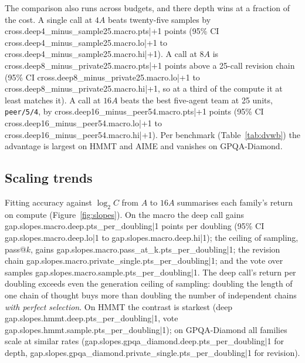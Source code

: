 \documentclass[11pt]{article}
\begin{document}
{{{{\begin{table}[htbp]
\centering
\small

\caption{Macro paired differences in accuracy points at equal realized compute $C = mA$.}
\label{tab:dvw}
\end{table}

The comparison also runs across budgets, and there depth wins at a fraction of the cost. A single call at
$4A$ beats twenty-five samples by {{cross.deep4_minus_sample25.macro.pts|+1}} points (95\% CI
{{cross.deep4_minus_sample25.macro.lo|+1}} to {{cross.deep4_minus_sample25.macro.hi|+1}}). A call at $8A$ is
{{cross.deep8_minus_private25.macro.pts|+1}} points above a 25-call revision chain (95\% CI
{{cross.deep8_minus_private25.macro.lo|+1}} to {{cross.deep8_minus_private25.macro.hi|+1}}, so at a third
of the compute it at least matches it). A call at $16A$
beats the best five-agent team at 25 units, \texttt{peer/5/4}, by {{cross.deep16_minus_peer54.macro.pts|+1}}
points (95\% CI {{cross.deep16_minus_peer54.macro.lo|+1}} to {{cross.deep16_minus_peer54.macro.hi|+1}}).
Per benchmark (Table~\ref{tab:dvwb}) the advantage is largest on HMMT and AIME and vanishes on GPQA-Diamond.

\begin{table}[htbp]
\centering
\small

\caption{Per-benchmark paired differences in points at equal realized compute. With 24 items per benchmark
one item is 4.2 points; intervals are in \texttt{numbers.json}.}
\label{tab:dvwb}
\end{table}

\subsection{Scaling trends}
\label{sec:slopes}

Fitting accuracy against $\log_2 C$ from $A$ to $16A$ summarises each family's return on compute
(Figure~\ref{fig:slopes}). On the macro the deep call gains {{gap.slopes.macro.deep.pts_per_doubling|1}}
points per doubling (95\% CI {{gap.slopes.macro.deep.lo|1}} to {{gap.slopes.macro.deep.hi|1}}); the ceiling of
sampling, pass@$k$, gains {{gap.slopes.macro.pass_at_k.pts_per_doubling|1}}; the revision chain
{{gap.slopes.macro.private_single.pts_per_doubling|1}}; and the vote over samples
{{gap.slopes.macro.sample.pts_per_doubling|1}}. The deep call's return per doubling exceeds even the
generation ceiling of sampling: doubling the length of one chain of thought buys more than doubling the
number of independent chains \emph{with perfect selection}. On HMMT the contrast is starkest (deep
{{gap.slopes.hmmt.deep.pts_per_doubling|1}}, vote {{gap.slopes.hmmt.sample.pts_per_doubling|1}}); on
GPQA-Diamond all families scale at similar rates ({{gap.slopes.gpqa_diamond.deep.pts_per_doubling|1}} for depth,
{{gap.slopes.gpqa_diamond.private_single.pts_per_doubling|1}} for revision).

}}}}
\end{document}
